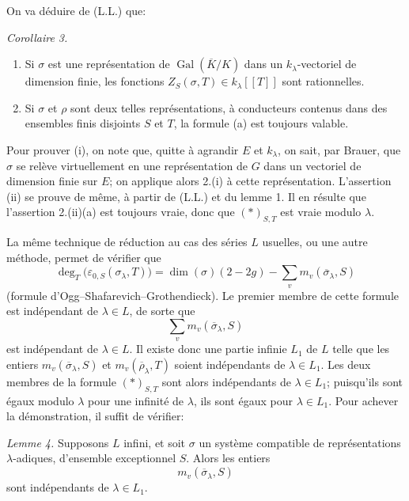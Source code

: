 \documentclass[11pt]{article}
\newcommand{\Gal}{\operatorname{Gal}}
\newcommand{\eps}{\varepsilon}
\begin{document}
On va déduire de (L.L.) que:

\emph{Corollaire 3.}
\begin{enumerate}[label=(\roman*)]
\item Si \(\sigma\) est une représentation de \(\Gal(\overline K/K)\) dans un \(k_\lambda\)-vectoriel de dimension finie, les fonctions \(Z_S(\sigma,T)\in k_\lambda[[T]]\) sont rationnelles.
\item Si \(\sigma\) et \(\rho\) sont deux telles représentations, à conducteurs contenus dans des ensembles finis disjoints \(S\) et \(T\), la formule (a) est toujours valable.
\end{enumerate}

Pour prouver (i), on note que, quitte à agrandir \(E\) et \(k_\lambda\), on sait, par Brauer, que \(\sigma\) se relève virtuellement en une représentation de \(G\) dans un vectoriel de dimension finie sur \(E\); on applique alors 2.(i) à cette représentation. L'assertion (ii) se prouve de même, à partir de (L.L.) et du lemme 1. Il en résulte que l'assertion 2.(ii)(a) est toujours vraie, donc que \((*)_{S,T}\) est vraie modulo \(\lambda\).

La même technique de réduction au cas des séries \(L\) usuelles, ou une autre méthode, permet de vérifier que
\[
\deg_T\bigl(\eps_{0,S}(\sigma_\lambda,T)\bigr)
=
\dim(\sigma)(2-2g)-\sum_v m_v(\overline{\sigma}_\lambda,S)
\]
(formule d'Ogg--Shafarevich--Grothendieck). Le premier membre de cette formule est indépendant de \(\lambda\in L\), de sorte que
\[
\sum_v m_v(\overline{\sigma}_\lambda,S)
\]
est indépendant de \(\lambda\in L\). Il existe donc une partie infinie \(L_1\) de \(L\) telle que les entiers \(m_v(\overline{\sigma}_\lambda,S)\) et \(m_v(\overline{\rho}_\lambda,T)\) soient indépendants de \(\lambda\in L_1\). Les deux membres de la formule \((*)_{S,T}\) sont alors indépendants de \(\lambda\in L_1\); puisqu'ils sont égaux modulo \(\lambda\) pour une infinité de \(\lambda\), ils sont égaux pour \(\lambda\in L_1\). Pour achever la démonstration, il suffit de vérifier:

\emph{Lemme 4.} Supposons \(L\) infini, et soit \(\sigma\) un système compatible de représentations \(\lambda\)-adiques, d'ensemble exceptionnel \(S\). Alors les entiers
\[
m_v(\overline{\sigma}_\lambda,S)
\]
sont indépendants de \(\lambda\in L_1\).
\end{document}
